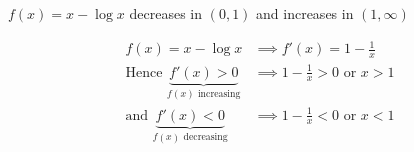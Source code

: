 \documentclass[14pt,fleqn]{extarticle}
\newcommand\dfx{1-\frac{1}{x}}
\begin{document}
 
\begin{snippet}
    \correct
    
    $f(x) = x - \log x$ decreases in $\left(0,1 \right)$ and increases in $\left(1,\infty \right)$ 

    
    \reason
    
    \begin{align}
	f(x) = x - \log x &\implies f'(x) = 1 - \frac{1}{x} \\
	\text{Hence } \underbrace{f'(x) > 0}_{f(x) \text{ increasing}} &\implies \dfx > 0 \text{ or } x > 1 \\
	\text{and } \underbrace{f'(x) < 0}_{f(x)\text{ decreasing}} &\implies \dfx < 0\text{ or } x < 1 
\end{align}

\end{snippet} 
\end{document}
